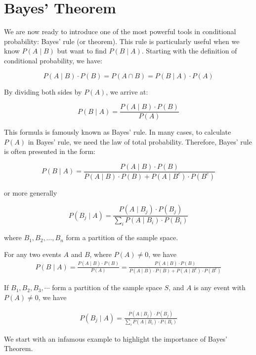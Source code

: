 \section{Bayes' Theorem}
We are now ready to introduce one of the most powerful tools in conditional probability: Bayes' rule (or theorem). This rule is particularly useful when we know \( P(A \mid B) \) but want to find \( P(B \mid A) \). Starting with the definition of conditional probability, we have:

\[
P(A \mid B) \cdot P(B) = P(A \cap B) = P(B \mid A) \cdot P(A)
\]

By dividing both sides by \( P(A) \), we arrive at:

\[
P(B \mid A) = \frac{P(A \mid B) \cdot P(B)}{P(A)}
\]

This formula is famously known as Bayes' rule. In many cases, to calculate \( P(A) \) in Bayes' rule, we need the law of total probability. Therefore, Bayes' rule is often presented in the form:

\[
P(B \mid A) = \frac{P(A \mid B) \cdot P(B)}{P(A \mid B) \cdot P(B) + P(A \mid B^c) \cdot P(B^c)}
\]

or more generally

\[
P\left(B_j \mid A\right) = \frac{P\left(A \mid B_j\right) \cdot P\left(B_j\right)}{\sum_i P\left(A \mid B_i\right) \cdot P\left(B_i\right)}
\]

where \( B_1, B_2, \ldots, B_n \) form a partition of the sample space.

\begin{theorem}
    For any two events $A$ and $B$, where $P(A) \neq 0$, we have
    \begin{align*}
    P(B \mid A) = \frac{P(A \mid B) \cdot P(B)}{P(A)}
     = \frac{P(A \mid B) \cdot P(B)}{P(A \mid B) \cdot P(B) + P(A \mid B^c) \cdot P(B^c)}
    \end{align*}

    If $B_1, B_2, B_3, \cdots$ form a partition of the sample space $S$, and $A$ is any event with $P(A) \neq 0$, we have

    \begin{align*}
    P\left(B_j \mid A\right) = \frac{P\left(A \mid B_j\right) \cdot P\left(B_j\right)}{\sum_i P\left(A \mid B_i\right) \cdot P\left(B_i\right)}
    \end{align*}
\end{theorem}

We start with an infamous example to highlight the importance of Bayes' Theorem.

